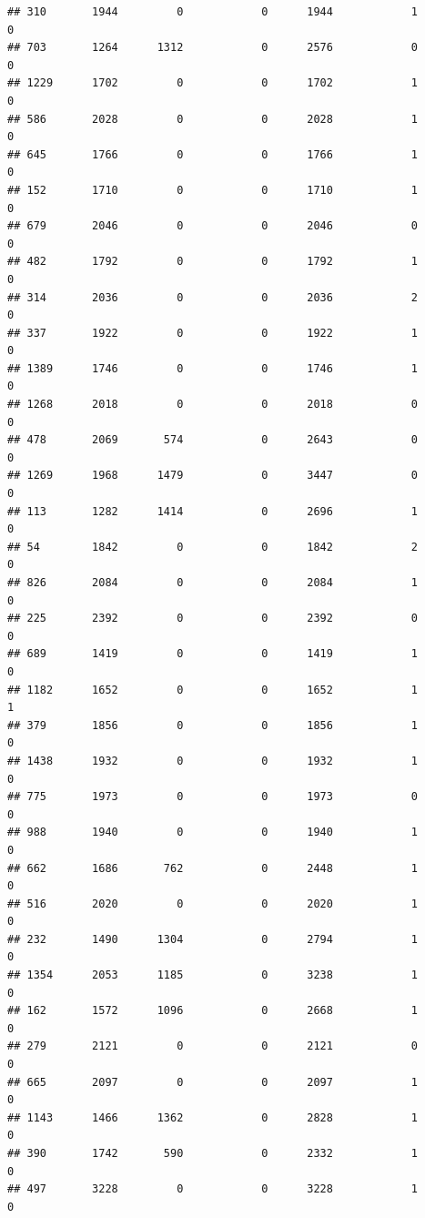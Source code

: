 \documentclass[]{article}
\begin{document}
\begin{verbatim}
## 310       1944         0            0      1944            1            0
## 703       1264      1312            0      2576            0            0
## 1229      1702         0            0      1702            1            0
## 586       2028         0            0      2028            1            0
## 645       1766         0            0      1766            1            0
## 152       1710         0            0      1710            1            0
## 679       2046         0            0      2046            0            0
## 482       1792         0            0      1792            1            0
## 314       2036         0            0      2036            2            0
## 337       1922         0            0      1922            1            0
## 1389      1746         0            0      1746            1            0
## 1268      2018         0            0      2018            0            0
## 478       2069       574            0      2643            0            0
## 1269      1968      1479            0      3447            0            0
## 113       1282      1414            0      2696            1            0
## 54        1842         0            0      1842            2            0
## 826       2084         0            0      2084            1            0
## 225       2392         0            0      2392            0            0
## 689       1419         0            0      1419            1            0
## 1182      1652         0            0      1652            1            1
## 379       1856         0            0      1856            1            0
## 1438      1932         0            0      1932            1            0
## 775       1973         0            0      1973            0            0
## 988       1940         0            0      1940            1            0
## 662       1686       762            0      2448            1            0
## 516       2020         0            0      2020            1            0
## 232       1490      1304            0      2794            1            0
## 1354      2053      1185            0      3238            1            0
## 162       1572      1096            0      2668            1            0
## 279       2121         0            0      2121            0            0
## 665       2097         0            0      2097            1            0
## 1143      1466      1362            0      2828            1            0
## 390       1742       590            0      2332            1            0
## 497       3228         0            0      3228            1            0

\end{verbatim}
\end{document}
